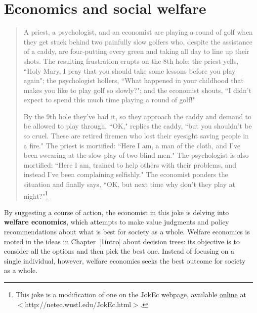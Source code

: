 \chapter{Economics and social welfare}
\label{2pareto}


\begin{quotation}
A priest, a psychologist, and an economist are playing a round of golf when they get stuck behind two painfully slow golfers who, despite the assistance of a caddy, are four-putting every green and taking all day to line up their shots. The resulting frustration erupts on the 8th hole: the priest yells, ``Holy Mary, I pray that you should take some lessons before you play again"; the psychologist hollers, ``What happened in your childhood that makes you like to play golf so slowly?"; and the economist shouts, ``I didn't expect to spend this much time playing a round of golf!"

By the 9th hole they've had it, so they approach the caddy and demand to be allowed to play through. ``OK," replies the caddy, ``but you shouldn't be so cruel. These are retired firemen who lost their eyesight saving people in a fire." The priest is mortified: ``Here I am, a man of the cloth, and I've been swearing at the slow play of two blind men." The psychologist is also mortified: ``Here I am, trained to help others with their problems, and instead I've been complaining selfishly." The economist ponders the situation and finally says, ``OK, but next time why don't they play at night?"\footnote{This joke is a modification of one on the JokEc webpage, available \href{http://netec.wustl.edu/JokEc.html}{online} at $<$http://netec.wustl.edu/JokEc.html$>$.}
\end{quotation}

\vspace*{.4cm}

\noindent By suggesting a course of action, the economist in this joke is delving into \textbf{welfare economics}, which attempts to make value judgments and policy recommendations about what is best for society as a whole. Welfare economics is rooted in the ideas in Chapter~\ref{1intro} about decision trees: its objective is to consider all the options and then pick the best one. Instead of  focusing on a single individual, however, welfare economics seeks the best outcome for society as a whole.

